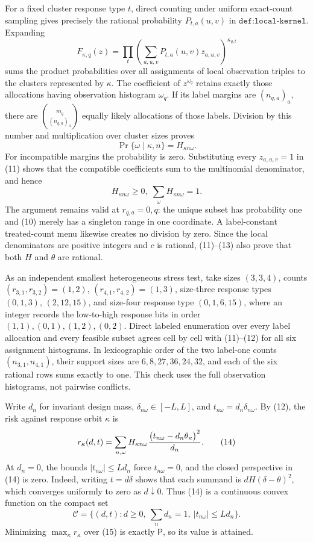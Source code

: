 For a fixed cluster response type \(t\), direct counting under uniform exact-count sampling gives precisely the rational probability \(P_{t,a}(u,v)\) in \(\texttt{def:local-kernel}\).  Expanding
\[
 F_{\kappa,q}(z)=\prod_t
 \left(\sum_{a,u,v}P_{t,a}(u,v)z_{a,u,v}\right)^{\kappa_{q,t}}             \tag{11}
\]
sums the product probabilities over all assignments of local observation triples to the clusters represented by \(\kappa\).  The coefficient of \(z^{\omega_q}\) retains exactly those allocations having observation histogram \(\omega_q\).  If its label margins are \((n_{q,a})_a\), there are
\(
 \binom{m_q}{(n_{q,a})_a}
\)
equally likely allocations of those labels.  Division by this number and multiplication over cluster sizes proves
\[
 \Pr\{\omega\mid\kappa,n\}=H_{\kappa n\omega}.                            \tag{12}
\]
For incompatible margins the probability is zero.  Substituting every \(z_{a,u,v}=1\) in (11) shows that the compatible coefficients sum to the multinomial denominator, and hence
\[
 H_{\kappa n\omega}\ge0,\; \sum_{\omega}H_{\kappa n\omega}=1.           \tag{13}
\]
The argument remains valid at \(r_{q,a}=0,q\): the unique subset has probability one and (10) merely has a singleton range in one coordinate.  A label-constant treated-count menu likewise creates no division by zero.  Since the local denominators are positive integers and \(c\) is rational, (11)--(13) also prove that both \(H\) and \(\theta\) are rational.

As an independent smallest heterogeneous stress test, take sizes \((3,3,4)\), counts \((r_{3,1},r_{3,2})=(1,2)\), \((r_{4,1},r_{4,2})=(1,3)\), size-three response types \((0,1,3)\), \((2,12,15)\), and size-four response type \((0,1,6,15)\), where an integer records the low-to-high response bits in order \((1,1),(0,1),(1,2),(0,2)\).  Direct labeled enumeration over every label allocation and every feasible subset agrees cell by cell with (11)--(12) for all six assignment histograms.  In lexicographic order of the two label-one counts \((n_{3,1},n_{4,1})\), their support sizes are \(6,8,27,36,24,32\), and each of the six rational rows sums exactly to one.  This check uses the full observation histograms, not pairwise conflicts.

Write \(d_n\) for invariant design mass, \(\delta_{n\omega}\in[-L,L]\), and \(t_{n\omega}=d_n\delta_{n\omega}\).  By (12), the risk against response orbit \(\kappa\) is
\[
 r_\kappa(d,t)=\sum_{n,\omega}H_{\kappa n\omega}
       {\bigl(t_{n\omega}-d_n\theta_\kappa\bigr)^2\over d_n}.             \tag{14}
\]
At \(d_n=0\), the bounds \(|t_{n\omega}|\le Ld_n\) force \(t_{n\omega}=0\), and the closed perspective in (14) is zero.  Indeed, writing \(t=d\delta\) shows that each summand is \(dH(\delta-\theta)^2\), which converges uniformly to zero as \(d\downarrow0\).  Thus (14) is a continuous convex function on the compact set
\[
 \mathcal C=\{(d,t):d\ge0,\ \sum_nd_n=1,\ |t_{n\omega}|\le Ld_n\}.         \tag{15}
\]
Minimizing \(\max_\kappa r_\kappa\) over (15) is exactly \(\mathsf P\), so its value is attained.

